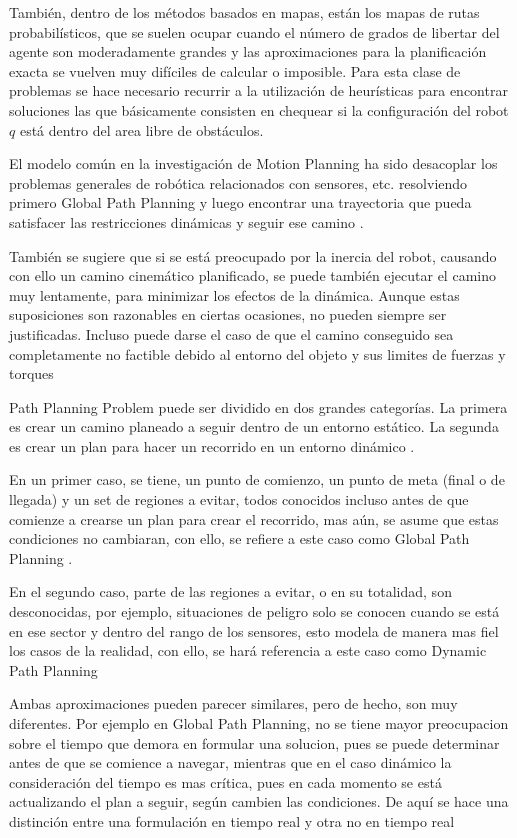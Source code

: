 Tambi\'en, dentro de los m\'etodos basados en mapas, est\'an los mapas de rutas probabil\'isticos,  que se suelen ocupar cuando el n\'umero de grados de libertar del agente son moderadamente grandes y las aproximaciones para la planificaci\'on exacta se vuelven muy dif\'iciles de calcular o imposible.  Para esta clase de problemas se hace necesario recurrir a la utilizaci\'on de heur\'isticas para encontrar soluciones las que b\'asicamente consisten en chequear si la configuraci\'on del robot $q$ est\'a dentro del area libre de obst\'aculos.


El modelo com\'un en la investigaci\'on de Motion Planning ha sido desacoplar los problemas generales de rob\'otica relacionados con sensores, etc. resolviendo primero Global Path Planning y luego encontrar una trayectoria que pueda satisfacer las restricciones din\'amicas y seguir ese camino \cite{LaValle99}.


Tambi\'en se sugiere que si se est\'a preocupado por la inercia del robot, causando con ello un camino cinem\'atico planificado, se puede tambi\'en ejecutar el camino muy lentamente, para minimizar los efectos de la din\'amica. Aunque estas suposiciones son razonables en ciertas ocasiones, no pueden siempre ser justificadas. Incluso puede darse el caso de que el camino conseguido sea completamente no factible debido al entorno del objeto y sus limites de fuerzas y torques \cite{LaValle99}

Path Planning Problem puede ser dividido en dos grandes categor\'ias. La primera es crear un camino planeado a seguir dentro de un entorno est\'atico. La segunda es crear un plan para hacer un recorrido en un entorno din\'amico \cite{Goldman94}.

En un primer caso, se tiene, un punto de comienzo, un punto de meta (final o de llegada) y un set de regiones a evitar, todos conocidos incluso antes de que comienze a crearse un plan para crear el recorrido, mas a\'un, se asume que estas condiciones no cambiaran, con ello, se refiere a este caso como Global Path Planning \cite{Goldman94}.

En el segundo caso, parte de las regiones a evitar, o en su totalidad, son desconocidas, por ejemplo, situaciones de peligro solo se conocen cuando se est\'a en ese sector y dentro del rango de los sensores, esto modela de manera mas fiel los casos de la realidad, con ello, se har\'a referencia a este caso como Dynamic Path Planning

Ambas aproximaciones pueden parecer similares, pero de hecho, son muy diferentes. Por ejemplo en Global Path Planning, no se tiene mayor preocupacion sobre el tiempo que demora en formular una solucion, pues se puede determinar antes de que se comience a navegar, mientras que en el caso din\'amico la consideraci\'on del tiempo es mas cr\'itica, pues en cada momento se est\'a actualizando el plan a seguir, seg\'un cambien las condiciones. De aqu\'i se hace una distinci\'on entre una formulaci\'on en tiempo real y otra no en tiempo real \cite{Goldman94}

